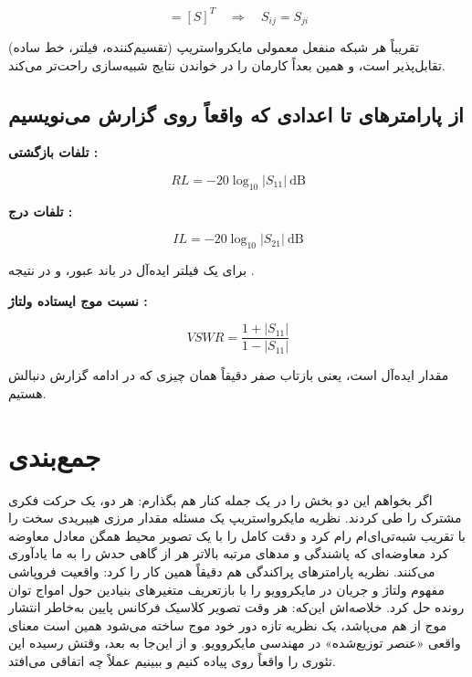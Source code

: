 \documentclass[12pt]{article}
\begin{document}
	\begin{equation}
		[S] = [S]^T \quad \Rightarrow \quad S_{ij} = S_{ji}
	\end{equation}
	
	تقریباً هر شبکه منفعل معمولی مایکرواستریپ (تقسیم‌کننده، فیلتر، خط ساده) تقابل‌پذیر است، و همین بعداً کارمان را در خواندن نتایج شبیه‌سازی راحت‌تر می‌کند.
	
	\subsection{از پارامترهای  تا اعدادی که واقعاً روی گزارش می‌نویسیم}
	
	\textbf{تلفات بازگشتی :}
	
	\begin{equation}
		RL = -20\log_{10}|S_{11}|\ \text{dB}
	\end{equation}
	
	\textbf{تلفات درج :}
	
	\begin{equation}
		IL = -20\log_{10}|S_{21}|\ \text{dB}
	\end{equation}
	
	برای یک فیلتر ایده‌آل در باند عبور،  و در نتیجه .
	
	\textbf{نسبت موج ایستاده ولتاژ :}
	
	\begin{equation}
		VSWR = \frac{1+|S_{11}|}{1-|S_{11}|}
	\end{equation}
	
	مقدار ایده‌آل  است، یعنی بازتاب صفر  دقیقاً همان چیزی که در ادامه گزارش دنبالش هستیم.
	
	

	\section{جمع‌بندی}

	
	اگر بخواهم این دو بخش را در یک جمله کنار هم بگذارم: هر دو، یک حرکت فکری مشترک را طی کردند. نظریه مایکرواستریپ یک مسئله مقدار مرزی هیبریدی سخت را با تقریب شبه‌تی‌ای‌ام رام کرد و دقت کامل را با یک تصویر محیط همگن معادل معاوضه کرد معاوضه‌ای که پاشندگی و مدهای مرتبه بالاتر هر از گاهی حدش را به ما یادآوری می‌کنند. نظریه پارامترهای پراکندگی هم دقیقاً همین کار را کرد: واقعیت فروپاشی مفهوم ولتاژ و جریان در مایکروویو را با بازتعریف متغیرهای بنیادین حول امواج توان رونده حل کرد. خلاصه‌اش این‌که: هر وقت تصویر کلاسیک فرکانس پایین به‌خاطر انتشار موج از هم می‌پاشد، یک نظریه تازه دور خود موج ساخته می‌شود همین است معنای واقعی «عنصر توزیع‌شده» در مهندسی مایکروویو. و از این‌جا به بعد، وقتش رسیده این تئوری را واقعاً روی  پیاده کنیم و ببینیم عملاً چه اتفاقی می‌افتد.
	
\end{document}
